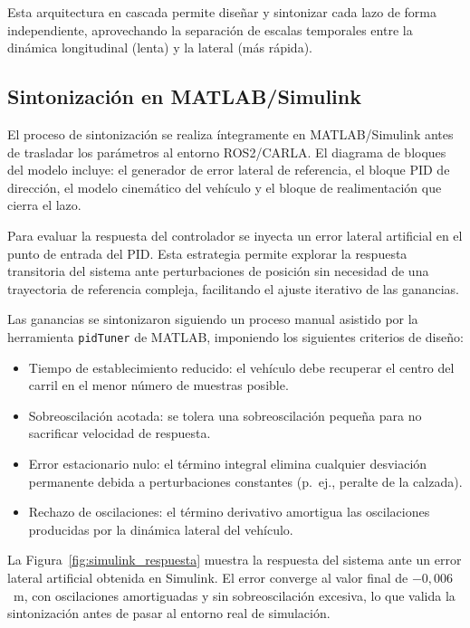 \documentclass[12pt, a4paper]{article}
\begin{document}
Esta arquitectura en cascada permite diseñar y sintonizar cada lazo de forma independiente, aprovechando la separación de escalas temporales entre la dinámica longitudinal (lenta) y la lateral (más rápida).

\subsection{Sintonización en MATLAB/Simulink}

El proceso de sintonización se realiza íntegramente en MATLAB/Simulink antes de trasladar los parámetros al entorno ROS2/CARLA. El diagrama de bloques del modelo incluye: el generador de error lateral de referencia, el bloque PID de dirección, el modelo cinemático del vehículo y el bloque de realimentación que cierra el lazo.

Para evaluar la respuesta del controlador se inyecta un error lateral artificial en el punto de entrada del PID. Esta estrategia permite explorar la respuesta transitoria del sistema ante perturbaciones de posición sin necesidad de una trayectoria de referencia compleja, facilitando el ajuste iterativo de las ganancias.

Las ganancias se sintonizaron siguiendo un proceso manual asistido por la herramienta \texttt{pidTuner} de MATLAB, imponiendo los siguientes criterios de diseño:

\begin{itemize}
    \item Tiempo de establecimiento reducido: el vehículo debe recuperar el centro del carril en el menor número de muestras posible.
    \item Sobreoscilación acotada: se tolera una sobreoscilación pequeña para no sacrificar velocidad de respuesta.
    \item Error estacionario nulo: el término integral elimina cualquier desviación permanente debida a perturbaciones constantes (p.~ej., peralte de la calzada).
    \item Rechazo de oscilaciones: el término derivativo amortigua las oscilaciones producidas por la dinámica lateral del vehículo.
\end{itemize}

La Figura~\ref{fig:simulink_respuesta} muestra la respuesta del sistema ante un error lateral artificial obtenida en Simulink. El error converge al valor final de $-0{,}006$~m, con oscilaciones amortiguadas y sin sobreoscilación excesiva, lo que valida la sintonización antes de pasar al entorno real de simulación.
\end{document}
